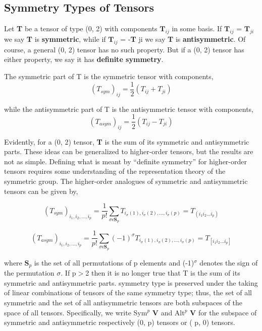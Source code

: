 \subsection{Symmetry Types of Tensors}
Let \textbf{T} be a tensor of type (0, 2) with components $\textbf{T}_{ij}$ in some basis. If $\textbf{T}_{ij}$ = $\textbf{T}_{ji}$ we
say \textbf{T} is \textbf{symmetric}, while if $\textbf{T}_{ij}$ = -\textbf{T} ji we say \textbf{T} is \textbf{antisymmetric}. Of course, a
general (0, 2) tensor has no such property. But if a (0, 2) tensor has either property,
we say it has \textbf{definite symmetry}.

The symmetric part of T is the symmetric tensor with components,
\begin{equation}
    (T_{sym})_{ij} = \frac{1}{2} (T_{ij} + T_{ji})
\end{equation}

while the antisymmetric part of T is the antisymmetric tensor with
components,
\begin{equation}
    (T_{asym})_{ij} = \frac{1}{2} (T_{ij} - T_{ji})
\end{equation}

Evidently, for a (0, 2) tensor, \textbf{T} is the sum of its symmetric and antisymmetric
parts. These ideas can be generalized to higher-order tensors, but the results are not
as simple. Defining what is meant by “definite symmetry” for higher-order tensors
requires some understanding of the representation theory of the symmetric group.
The higher-order analogues of symmetric and antisymmetric tensors can be given by,

\begin{equation}
    (T_{sym})_{i_1, i_2, ..., i_p} = \frac{1}{p!}\sum_{\sigma \epsilon \textbf{S}_p} T_{i_\sigma(1), i_\sigma(2), ..., i_\sigma(p)} = T_{(i_1i_2...i_p)}
\end{equation}

\begin{equation}
    (T_{asym})_{i_1, i_2, ..., i_p} = \frac{1}{p!}\sum_{\sigma \epsilon \textbf{S}_p} (-1)^{\sigma} T_{i_\sigma(1), i_\sigma(2), ..., i_\sigma(p)} = T_{[i_1i_2...i_p]}
\end{equation}

where $\textbf{S}_p$ is the set of all permutations of p elements and (-1)$^ \sigma$ denotes the
sign of the permutation $\sigma$. If p$>$2 then it is no longer true that T is the sum of
its symmetric and antisymmetric parts. symmetry type is
preserved under the taking of linear combinations of tensors of the same symmetry
type; thus, the set of all symmetric and the set of all antisymmetric tensors are both
subspaces of the space of all tensors. Specifically, we write Sym$^p$ \textbf{V} and
Alt$^p$ \textbf{V} for the subspace of symmetric and antisymmetric respectively (0, p) tensors
or ( p, 0) tensors.

